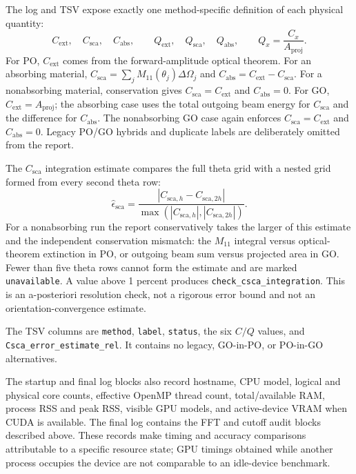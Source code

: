 \documentclass[
  10pt,
  a4paper,
]{article}
\begin{document}
The log and TSV expose exactly one method-specific definition of each physical
quantity:
\[
 C_{\mathrm{ext}},\quad C_{\mathrm{sca}},\quad C_{\mathrm{abs}},
 \qquad
 Q_{\mathrm{ext}},\quad Q_{\mathrm{sca}},\quad Q_{\mathrm{abs}},
 \qquad Q_x=\frac{C_x}{A_{\mathrm{proj}}}.
\]
For PO, $C_{\mathrm{ext}}$ comes from the forward-amplitude optical theorem.
For an absorbing material,
$C_{\mathrm{sca}}=\sum_jM_{11}(\theta_j)\Delta\Omega_j$ and
$C_{\mathrm{abs}}=C_{\mathrm{ext}}-C_{\mathrm{sca}}$. For a nonabsorbing
material, conservation gives $C_{\mathrm{sca}}=C_{\mathrm{ext}}$ and
$C_{\mathrm{abs}}=0$. For GO, $C_{\mathrm{ext}}=A_{\mathrm{proj}}$; the
absorbing case uses the total outgoing beam energy for $C_{\mathrm{sca}}$ and
the difference for $C_{\mathrm{abs}}$. The nonabsorbing GO case again enforces
$C_{\mathrm{sca}}=C_{\mathrm{ext}}$ and $C_{\mathrm{abs}}=0$. Legacy PO/GO
hybrids and duplicate labels are deliberately omitted from the report.

The $C_{\mathrm{sca}}$ integration estimate compares the full theta grid with
a nested grid formed from every second theta row:
\[
 \widehat\epsilon_{\mathrm{sca}}=
 \frac{|C_{\mathrm{sca},h}-C_{\mathrm{sca},2h}|}
 {\max(|C_{\mathrm{sca},h}|,|C_{\mathrm{sca},2h}|)}.
\]
For a nonabsorbing run the report conservatively takes the larger of this
estimate and the independent conservation mismatch: the $M_{11}$ integral
versus optical-theorem extinction in PO, or outgoing beam sum versus projected
area in GO. Fewer than five theta rows cannot form the estimate and are marked
\texttt{unavailable}. A value above 1 percent produces
\texttt{check\_csca\_integration}. This is an a-posteriori resolution check,
not a rigorous error bound and not an orientation-convergence estimate.

The TSV columns are \texttt{method}, \texttt{label}, \texttt{status}, the six
$C/Q$ values, and \texttt{Csca\_error\_estimate\_rel}. It contains no legacy,
GO-in-PO, or PO-in-GO alternatives.

The startup and final log blocks also record hostname, CPU model, logical and
physical core counts, effective OpenMP thread count, total/available RAM,
process RSS and peak RSS, visible GPU models, and active-device VRAM when CUDA
is available. The final log contains the FFT and cutoff audit blocks described
above. These records make timing and accuracy comparisons attributable to a
specific resource state; GPU timings obtained while another process occupies
the device are not comparable to an idle-device benchmark.
\end{document}
